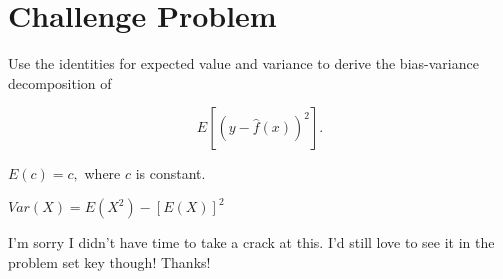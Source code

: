 \documentclass[11pt]{article}
\begin{document}
\section*{Challenge Problem}
Use the identities for expected value and variance to derive the bias-variance decomposition of 

$$ E\left[ \left(y - \hat{f}(x) \right)^2 \right].$$

$E(c) = c,$ where $c$ is constant.

$Var(X) = E(X^2) - [E(X)]^2$ 

\vspace{1cm}

I'm sorry I didn't have time to take a crack at this. I'd still love to see it in the problem set key though! Thanks!
\end{document}
